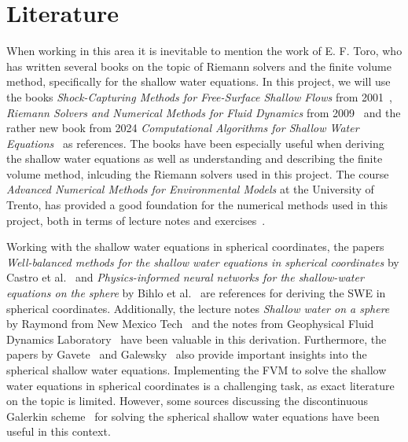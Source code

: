 \section{Literature}
When working in this area it is inevitable to mention the work of E. F. Toro, who has written several books on the topic of Riemann solvers and the finite volume method, specifically for the shallow water equations.
In this project, we will use the books \textit{Shock-Capturing Methods for Free-Surface Shallow Flows} from 2001~\cite{Toro2001-Shock}, \textit{Riemann Solvers and Numerical Methods for Fluid Dynamics} from 2009~\cite{Toro2009-Riemann} and the rather new book from 2024 \textit{Computational Algorithms for Shallow Water Equations}~\cite{Toro2024} as references.
The books have been especially useful when deriving the shallow water equations as well as understanding and describing the finite volume method, inlcuding the Riemann solvers used in this project.
The course \textit{Advanced Numerical Methods for Environmental Models} at the University of Trento, has provided a good foundation for the numerical methods used in this project, both in terms of lecture notes and exercises~\cite{trento_course}.

Working with the shallow water equations in spherical coordinates, the papers \textit{Well-balanced methods for the shallow water equations in spherical coordinates} by Castro et al.~\cite{Castro2017} and \textit{Physics-informed neural networks for the shallow-water equations on the sphere} by Bihlo et al.~\cite{Bihlo2022} are references for deriving the SWE in spherical coordinates.
Additionally, the lecture notes \textit{Shallow water on a sphere} by Raymond from New Mexico Tech~\cite{Raymond} and the notes from Geophysical Fluid Dynamics Laboratory~\cite{shallow_water_gfdl} have been valuable in this derivation.
Furthermore, the papers by Gavete~\cite{Gavete_2009} and Galewsky~\cite{Galewsky_2004} also provide important insights into the spherical shallow water equations.
Implementing the FVM to solve the shallow water equations in spherical coordinates is a challenging task, as exact literature on the topic is limited.
However, some sources discussing the discontinuous Galerkin scheme~\cite{Hesthaven2008} for solving the spherical shallow water equations have been useful in this context.

